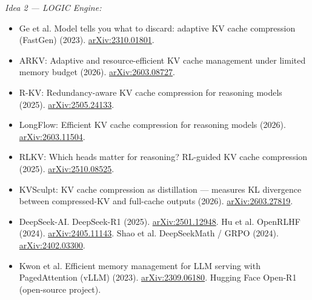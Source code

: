 \documentclass[11pt]{article}
\newcommand{\arxiv}[1]{\href{https://arxiv.org/abs/#1}{arXiv:#1}}
\begin{document}
\textit{Idea 2 --- LOGIC Engine:}
\begin{itemize}[leftmargin=1.2em,itemsep=1pt]
  \item Ge et al. Model tells you what to discard: adaptive KV cache compression (FastGen) (2023). \arxiv{2310.01801}.
  \item ARKV: Adaptive and resource-efficient KV cache management under limited memory budget (2026). \arxiv{2603.08727}.
  \item R-KV: Redundancy-aware KV cache compression for reasoning models (2025). \arxiv{2505.24133}.
  \item LongFlow: Efficient KV cache compression for reasoning models (2026). \arxiv{2603.11504}.
  \item RLKV: Which heads matter for reasoning? RL-guided KV cache compression (2025). \arxiv{2510.08525}.
  \item KVSculpt: KV cache compression as distillation --- measures KL divergence between compressed-KV and full-cache outputs (2026). \arxiv{2603.27819}.
  \item DeepSeek-AI. DeepSeek-R1 (2025). \arxiv{2501.12948}. \; Hu et al. OpenRLHF (2024). \arxiv{2405.11143}. \; Shao et al. DeepSeekMath / GRPO (2024). \arxiv{2402.03300}.
  \item Kwon et al. Efficient memory management for LLM serving with PagedAttention (vLLM) (2023). \arxiv{2309.06180}. \; Hugging Face Open-R1 (open-source project).
\end{itemize}
\end{document}

